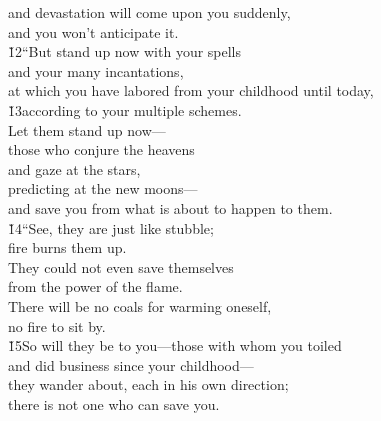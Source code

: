 \begin{poetry}
\poeml and devastation will come upon you suddenly, \\
\poemll    and you won't anticipate it. \\
\poeml \v{12}``But stand up now with your spells \\
\poemll    and your many incantations, \\
\poeml at which you have labored from your childhood until today, \\
\poeml \v{13}according to your multiple schemes. \\
\poeml Let them stand up now--- \\
\poemll    those who conjure the heavens \\
\poeml and gaze at the stars, \\
\poemll    predicting at the new moons--- \\
\poemlll       and save you from what is about to happen to them. \\
\poeml \v{14}``See, they are just like stubble; \\
\poemll    fire burns them up. \\
\poeml They could not even save themselves \\
\poemll    from the power of the flame. \\
\poeml There will be no coals for warming oneself, \\
\poemll    no fire to sit by. \\
\poeml \v{15}So will they be to you---those with whom you toiled \\
\poemll    and did business since your childhood--- \\
\poeml they wander about, each in his own direction; \\
\poemll    there is not one who can save you.
\end{poetry}

